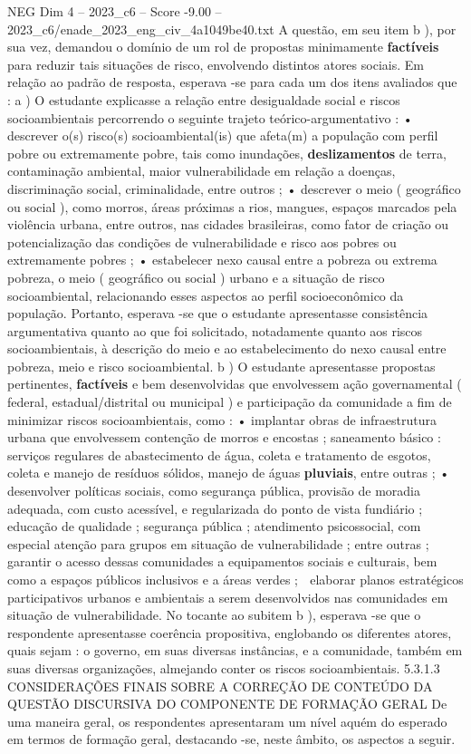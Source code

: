 \begin{textsample}{NEG Dim 4 – 2023\_c6 – Score -9.00 – 2023\_c6/enade\_2023\_eng\_civ\_4a1049be40.txt}
A questão, em seu item b ), por sua vez, demandou o domínio de um rol de propostas minimamente \textbf{factíveis} para reduzir tais situações de risco, envolvendo distintos atores sociais.
Em relação ao padrão de resposta, esperava -se para cada um dos itens avaliados que : a ) O estudante explicasse a relação entre desigualdade social e riscos socioambientais percorrendo o seguinte trajeto teórico-argumentativo : • descrever o(s) risco(s) socioambiental(is) que afeta(m) a população com perfil pobre ou extremamente pobre, tais como inundações, \textbf{deslizamentos} de terra, contaminação ambiental, maior vulnerabilidade em relação a doenças, discriminação social, criminalidade, entre outros ; • descrever o meio ( geográfico ou social ), como morros, áreas próximas a rios, mangues, espaços marcados pela violência urbana, entre outros, nas cidades brasileiras, como fator de criação ou potencialização das condições de vulnerabilidade e risco aos pobres ou extremamente pobres ; • estabelecer nexo causal entre a pobreza ou extrema pobreza, o meio ( geográfico ou social ) urbano e a situação de risco socioambiental, relacionando esses aspectos ao perfil socioeconômico da população.
Portanto, esperava -se que o estudante apresentasse consistência argumentativa quanto ao que foi solicitado, notadamente quanto aos riscos socioambientais, à descrição do meio e ao estabelecimento do nexo causal entre pobreza, meio e risco socioambiental. b ) O estudante apresentasse propostas pertinentes, \textbf{factíveis} e bem desenvolvidas que envolvessem ação governamental ( federal, estadual/distrital ou municipal ) e participação da comunidade a fim de minimizar riscos socioambientais, como : • implantar obras de infraestrutura urbana que envolvessem contenção de morros e encostas ; saneamento básico : serviços regulares de abastecimento de água, coleta e tratamento de esgotos, coleta e manejo de resíduos sólidos, manejo de águas \textbf{pluviais}, entre outras ; • desenvolver políticas sociais, como segurança pública, provisão de moradia adequada, com custo acessível, e regularizada do ponto de vista fundiário ; educação de qualidade ; segurança pública ; atendimento psicossocial, com especial atenção para grupos em situação de vulnerabilidade ; entre outras ;  garantir o acesso dessas comunidades a equipamentos sociais e culturais, bem como a espaços públicos inclusivos e a áreas verdes ;  elaborar planos estratégicos participativos urbanos e ambientais a serem desenvolvidos nas comunidades em situação de vulnerabilidade.
No tocante ao subitem b ), esperava -se que o respondente apresentasse coerência propositiva, englobando os diferentes atores, quais sejam : o governo, em suas diversas instâncias, e a comunidade, também em suas diversas organizações, almejando conter os riscos socioambientais. 5.3.1.3 CONSIDERAÇÕES FINAIS SOBRE A CORREÇÃO DE CONTEÚDO DA QUESTÃO DISCURSIVA DO COMPONENTE DE FORMAÇÃO GERAL De uma maneira geral, os respondentes apresentaram um nível aquém do esperado em termos de formação geral, destacando -se, neste âmbito, os aspectos a seguir.

\end{textsample}
